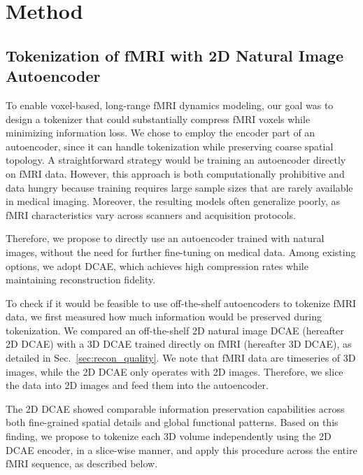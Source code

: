 \section{Method}

\subsection{Tokenization of fMRI with 2D Natural Image Autoencoder}
\label{sec:3.1}
To enable voxel-based, long-range fMRI dynamics modeling, our goal was to design a tokenizer that could substantially compress fMRI voxels while minimizing information loss.
We chose to employ the encoder part of an autoencoder, since it can handle tokenization while preserving coarse spatial topology. 
A straightforward strategy would be training an autoencoder directly on fMRI data. However, this approach is both computationally prohibitive and data hungry because training requires large sample sizes that are rarely available in medical imaging. Moreover, the resulting models often generalize poorly, as fMRI characteristics vary across scanners and acquisition protocols.



Therefore, we propose to directly use an autoencoder trained with natural images, without the need for further fine-tuning on medical data.
Among existing options, we adopt DCAE, which achieves high compression rates while maintaining reconstruction fidelity. 







To check if it would be feasible to use off-the-shelf autoencoders to tokenize fMRI data, we first measured how much information would be preserved during tokenization. We compared an off-the-shelf 2D natural image DCAE (hereafter 2D DCAE) with a 3D DCAE trained directly on fMRI (hereafter 3D DCAE), as detailed in Sec.~\ref{sec:recon_quality}.
We note that fMRI data are timeseries of 3D images, while the 2D DCAE only operates with 2D images. Therefore, we slice the data into 2D images and feed them into the autoencoder. 

The 2D DCAE showed comparable information preservation capabilities across both fine-grained spatial details and global functional patterns.
Based on this finding, we propose to tokenize each 3D volume independently using the 2D DCAE encoder, in a slice-wise manner, and apply this procedure across the entire fMRI sequence, as described below.



